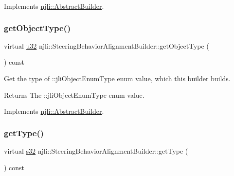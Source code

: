 Implements \mbox{\hyperlink{classnjli_1_1_abstract_builder_a902f73ea78031b06aca183a417f3413b}{njli\+::\+Abstract\+Builder}}.

\mbox{\label{classnjli_1_1_steering_behavior_alignment_builder_a584466cb5cda7cddd21ee1a2ca8eb9ee}} 
\subsubsection{\texorpdfstring{get\+Object\+Type()}{getObjectType()}}
{\footnotesize\ttfamily virtual \mbox{\hyperlink{_util_8h_a10e94b422ef0c20dcdec20d31a1f5049}{u32}} njli\+::\+Steering\+Behavior\+Alignment\+Builder\+::get\+Object\+Type (\begin{DoxyParamCaption}{ }\end{DoxyParamCaption}) const\hspace{0.3cm}{\ttfamily [virtual]}}

Get the type of \+::jli\+Object\+Enum\+Type enum value, which this builder builds.

\begin{DoxyReturn}{Returns}
The \+::jli\+Object\+Enum\+Type enum value. 
\end{DoxyReturn}


Implements \mbox{\hyperlink{classnjli_1_1_abstract_builder_a0f2d344fcf697b167f4f2b1122b5fb33}{njli\+::\+Abstract\+Builder}}.

\mbox{\label{classnjli_1_1_steering_behavior_alignment_builder_aeae4d890010be3da48f8221714d59c50}} 
\subsubsection{\texorpdfstring{get\+Type()}{getType()}}
{\footnotesize\ttfamily virtual \mbox{\hyperlink{_util_8h_aa62c75d314a0d1f37f79c4b73b2292e2}{s32}} njli\+::\+Steering\+Behavior\+Alignment\+Builder\+::get\+Type (\begin{DoxyParamCaption}{ }\end{DoxyParamCaption}) const\hspace{0.3cm}{\ttfamily [virtual]}}

